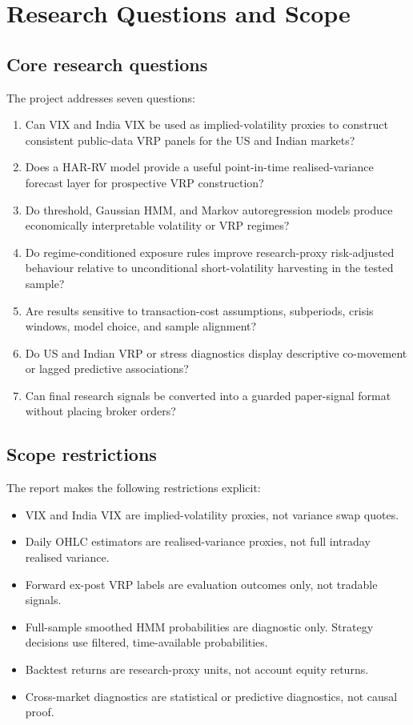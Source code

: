 \documentclass[11pt,a4paper]{article}
\begin{document}
\section{Research Questions and Scope}

\subsection{Core research questions}

The project addresses seven questions:

\begin{enumerate}
    \item Can VIX and India VIX be used as implied-volatility proxies to construct consistent public-data VRP panels for the US and Indian markets?
    \item Does a HAR-RV model provide a useful point-in-time realised-variance forecast layer for prospective VRP construction?
    \item Do threshold, Gaussian HMM, and Markov autoregression models produce economically interpretable volatility or VRP regimes?
    \item Do regime-conditioned exposure rules improve research-proxy risk-adjusted behaviour relative to unconditional short-volatility harvesting in the tested sample?
    \item Are results sensitive to transaction-cost assumptions, subperiods, crisis windows, model choice, and sample alignment?
    \item Do US and Indian VRP or stress diagnostics display descriptive co-movement or lagged predictive associations?
    \item Can final research signals be converted into a guarded paper-signal format without placing broker orders?
\end{enumerate}

\subsection{Scope restrictions}

The report makes the following restrictions explicit:

\begin{itemize}
    \item VIX and India VIX are implied-volatility proxies, not variance swap quotes.
    \item Daily OHLC estimators are realised-variance proxies, not full intraday realised variance.
    \item Forward ex-post VRP labels are evaluation outcomes only, not tradable signals.
    \item Full-sample smoothed HMM probabilities are diagnostic only. Strategy decisions use filtered, time-available probabilities.
    \item Backtest returns are research-proxy units, not account equity returns.
    \item Cross-market diagnostics are statistical or predictive diagnostics, not causal proof.
\end{itemize}
\end{document}
